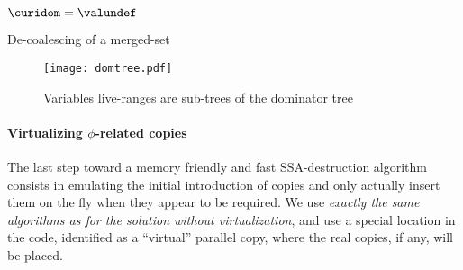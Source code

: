 \begin{algorithm}[h]
$\curidom=\valundef$\;
\BlankLine
\BlankLine
{}
\caption{\label{alg:alternative_ssa_destruction:domup} De-coalescing of 
a merged-set}
\end{algorithm}

\begin{figure}
\texttt{[image: domtree.pdf]}
\caption{\label{fig:alternative_ssa_destruction:fig:domtree}Variables live-ranges are sub-trees of the dominator tree}
\end{figure}


\paragraph{Virtualizing $\phi$-related copies}
The last step toward a memory friendly and fast SSA-destruction algorithm consists in emulating the initial introduction of copies and only actually insert them on the fly when they appear to be required. 
We use \emph{exactly the same algorithms as for the solution without virtualization}, and use a special location in the code, identified as a ``virtual'' parallel copy, where the real copies, if any, will be placed.

